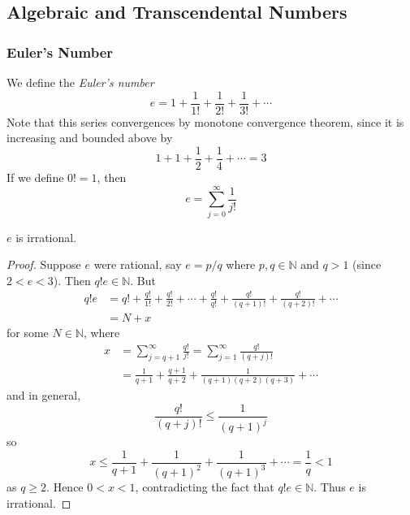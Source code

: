 \documentclass[10pt, a4paper, twoside]{report}
\begin{document}
\subsection{Algebraic and Transcendental Numbers}
\subsubsection{Euler's Number}
We define the \emph{Euler's number}
\[e=1+\frac 1{1!}+\frac 1{2!}+\frac 1{3!}+\cdots\]
Note that this series convergences by monotone convergence theorem, since it is increasing and bounded above by 
\[1+1+\frac 12+\frac 14+\cdots=3\]
If we define \(0!=1\), then 
\[e=\sum_{j=0}^{\infty}\frac 1{j!}\]
\begin{proposition}
    \(e\) is irrational.
\end{proposition}
\begin{proof}
    Suppose \(e\) were rational, say \(e=p/q\) where \(p,q\in\mathbb{N}\) and \(q>1\) (since \(2<e<3\)). Then \(q!e\in\mathbb{N}\). But 
    \begin{align*}
        q!e&=q!+\frac{q!}{1!}+\frac{q!}{2!}+\cdots+\frac{q!}{q!}+\frac{q!}{(q+1)!}+\frac{q!}{(q+2)!}+\cdots \\
        &=N+x
    \end{align*}
    for some \(N\in\mathbb{N}\), where 
    \begin{align*}
        x&=\sum_{j=q+1}^{\infty}\frac{q!}{j!}=\sum_{j=1}^{\infty}\frac{q!}{(q+j)!} \\
        &=\frac{1}{q+1}+\frac{q+1}{q+2}+\frac{1}{(q+1)(q+2)(q+3)}+\cdots    
    \end{align*}
    and in general,
    \[\frac{q!}{(q+j)!}\leq\frac 1{(q+1)^j}\]
    so 
    \[x\leq\frac 1{q+1}+\frac 1{(q+1)^2}+\frac 1{(q+1)^3}+\cdots=\frac 1q<1\]
    as \(q\geq 2\). Hence \(0<x<1\), contradicting the fact that \(q!e\in\mathbb{N}\). Thus \(e\) is irrational.
\end{proof}
\end{document}
